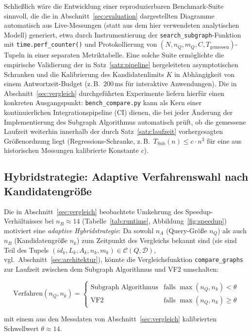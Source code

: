 \documentclass[a4paper,12pt]{article}
\theoremstyle{definition}
\begin{document}
Schließlich wäre die Entwicklung einer reproduzierbaren Benchmark-Suite sinnvoll, die die in Abschnitt~\ref{sec:evaluation} dargestellten Diagramme automatisch aus Live-Messungen (statt aus dem hier verwendeten analytischen Modell) generiert, etwa durch Instrumentierung der \texttt{search\_subgraph}-Funktion mit \texttt{time.perf\_counter()} und Protokollierung von $(N,n_Q,m_Q,C,T_{\text{gemessen}})$-Tupeln in einer separaten Metriktabelle. Eine solche Suite ermöglichte die empirische Validierung der in Satz~\ref{satz:pipeline} hergeleiteten asymptotischen Schranken und die Kalibrierung des Kandidatenlimits $K$ in Abhängigkeit von einem Antwortzeit-Budget (z.\,B.\ $200\,$ms für interaktive Anwendungen). Die in Abschnitt~\ref{sec:vergleich} durchgeführten Experimente liefern hierfür einen konkreten Ausgangspunkt: \texttt{bench\_compare.py} kann als Kern einer kontinuierlichen Integrationspipeline (CI) dienen, die bei jeder Änderung der Implementierung des Subgraph Algorithmus automatisch prüft, ob die gemessene Laufzeit weiterhin innerhalb der durch Satz~\ref{satz:laufzeit} vorhergesagten Größenordnung liegt (Regressions-Schranke, z.\,B.\ $T_{\text{Sub}}(n) \le c\cdot n^3$ für eine aus historischen Messungen kalibrierte Konstante $c$).

\subsection{Hybridstrategie: Adaptive Verfahrenswahl nach Kandidatengröße}
\label{sec:hybrid}

Die in Abschnitt~\ref{sec:vergleich} beobachtete Umkehrung des Speedup-Verhältnisses bei $n_B\approx 14$ (Tabelle~\ref{tab:runtime}, Abbildung~\ref{fig:speedup}) motiviert eine \emph{adaptive Hybridstrategie}: Da sowohl $n_A$ (Query-Größe $n_Q$) als auch $n_B$ (Kandidatengröße $n_k$) zum Zeitpunkt des Vergleichs bekannt sind (sie sind Teil des Tupels $(id_k,L_k,A_k,n_k,m_k)\in\mathcal{C}(Q,\mathcal{D})$, vgl.\ Abschnitt~\ref{sec:architektur}), könnte die Vergleichsfunktion \texttt{compare\_graphs} zur Laufzeit zwischen dem Subgraph Algorithmus und VF2 umschalten:

\[
\mathrm{Verfahren}(n_Q,n_k) = \begin{cases}
\text{Subgraph Algorithmus} & \text{falls } \max(n_Q,n_k) < \theta \\
\text{VF2} & \text{falls } \max(n_Q,n_k) \ge \theta
\end{cases}
\]

mit einem aus den Messdaten von Abschnitt~\ref{sec:vergleich} kalibrierten Schwellwert $\theta\approx 14$.
\end{document}

